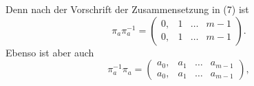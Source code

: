 
Denn nach der Vorschrift der Zusammensetzung in (7) ist
\[
\pi_a \pi_a^{-1} = \begin{pmatrix} 0, & 1 & \ldots & m-1 \\ 0, & 1 & \ldots & m-1 \end{pmatrix}.
\]
Ebenso ist aber auch
\[
\pi_a^{-1}\pi_a = \begin{pmatrix} a_0, & a_1 & \ldots & a_{m-1} \\ a_0, & a_1 & \ldots & a_{m-1} \end{pmatrix},
\]
